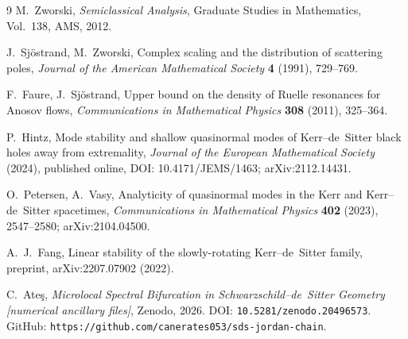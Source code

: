 \documentclass[12pt,a4paper]{amsart}
\theoremstyle{remark}
\begin{document}
\begin{thebibliography}{9}
M.~Zworski,
\textit{Semiclassical Analysis},
Graduate Studies in Mathematics, Vol.~138, AMS, 2012.

J.~Sj\"{o}strand, M.~Zworski,
Complex scaling and the distribution of scattering poles,
\textit{Journal of the American Mathematical Society} \textbf{4} (1991), 729--769.

F.~Faure, J.~Sj\"{o}strand,
Upper bound on the density of Ruelle resonances for Anosov flows,
\textit{Communications in Mathematical Physics} \textbf{308} (2011), 325--364.

P.~Hintz,
Mode stability and shallow quasinormal modes of Kerr--de~Sitter black holes
away from extremality,
\textit{Journal of the European Mathematical Society} (2024), published online,
DOI: 10.4171/JEMS/1463; arXiv:2112.14431.

O.~Petersen, A.~Vasy,
Analyticity of quasinormal modes in the Kerr and Kerr--de~Sitter spacetimes,
\textit{Communications in Mathematical Physics} \textbf{402} (2023), 2547--2580;
arXiv:2104.04500.

A.~J.~Fang,
Linear stability of the slowly-rotating Kerr--de~Sitter family,
preprint, arXiv:2207.07902 (2022).

C.~Ate\c{s},
\textit{Microlocal Spectral Bifurcation in Schwarzschild--de~Sitter Geometry
[numerical ancillary files]},
Zenodo, 2026.
DOI: \texttt{10.5281/zenodo.20496573}.
GitHub: \texttt{https://github.com/canerates053/sds-jordan-chain}.

\end{thebibliography}
\end{document}
